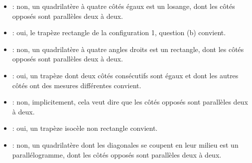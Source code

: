 \begin{corrige}
\begin{enumerate}
\begin{itemize}
            \item {} : non, un quadrilatère à quatre côtés égaux est un losange, dont les côtés opposés sont parallèles deux à deux. \medskip
            \item {} : oui, le trapèze rectangle de la configuration 1, question (b) convient. \medskip        
            \item {} : non, un quadrilatère à quatre angles droits est un rectangle, dont les côtés opposés sont parallèles  deux à deux. \medskip
            \item {} : oui, un trapèze dont deux côtés consécutifs sont égaux et dont les autres côtés ont des mesures différentes convient. \medskip
            \item {} : non, implicitement, cela veut dire que les côtés opposés sont parallèles deux à deux. \medskip
            \item {} : oui, un trapèze isocèle non rectangle convient. \medskip
            \item {} : non, un quadrilatère dont les diagonales se coupent en leur milieu est un parallélogramme, dont les côtés opposés sont parallèles deux à deux.
         \end{itemize}
   \end{enumerate}
\end{corrige}


\bigskip

